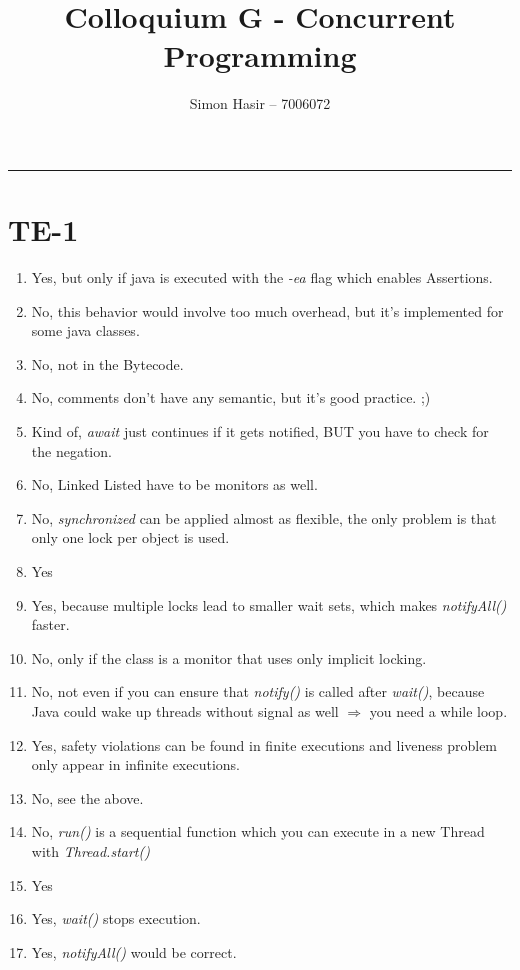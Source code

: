 \documentclass[12pt]{article}
\title{Colloquium G - Concurrent Programming}
\author{Simon Hasir -- 7006072}
\begin{document}
    \maketitle
    \noindent
    \rule{\linewidth}{0.4pt}
             
    \section{TE-1}
    \begin{enumerate}[label=(\alph*)]
        \item Yes, but only if java is executed with the \textit{-ea} flag which enables Assertions.
        \item No, this behavior would involve too much overhead, but it's implemented for some java classes.
        \item No, not in the Bytecode.
        \item No, comments don't have any semantic, but it's good practice. ;)
        \item Kind of, \textit{await} just continues if it gets notified, BUT you have to check for the negation.
        \item No, Linked Listed have to be monitors as well.
        \item No, \textit{synchronized} can be applied almost as flexible, 
        the only problem is that only one lock per object is used.
        \item Yes 
        \item Yes, because multiple locks lead to smaller wait sets, which makes \textit{notifyAll()} faster.
        \item No, only if the class is a monitor that uses only implicit locking.
        \item No, not even if you can ensure that \textit{notify()} is called after \textit{wait()}, because Java could 
        wake up threads without signal as well $\Rightarrow$ you need a while loop. 
        \item Yes, safety violations can be found in finite executions and liveness problem only appear in infinite executions.
        \item No, see the above.
        \item No, \textit{run()} is a sequential function which you can execute in a new Thread
         with \textit{Thread.start()}
        \item Yes
        \item Yes, \textit{wait()} stops execution.
        \item Yes, \textit{notifyAll()} would be correct.

\end{enumerate}
\end{document}
